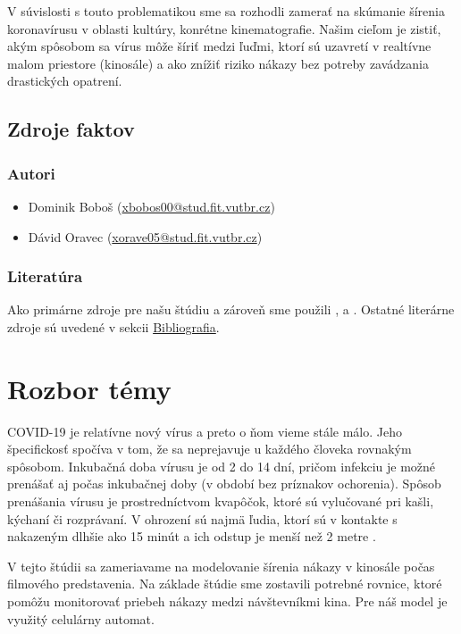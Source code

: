 \documentclass[a4paper, 11pt]{article}
\begin{document}
	\par V súvislosti s touto problematikou sme sa rozhodli zamerať na skúmanie šírenia koronavírusu v oblasti kultúry, konrétne kinematografie. Našim cieľom je zistiť, akým spôsobom sa vírus môže šíriť medzi ľuďmi, ktorí sú uzavretí v realtívne malom priestore (kinosále) a ako znížiť riziko nákazy bez potreby zavádzania drastických opatrení.
	
    	\subsection{Zdroje faktov}
    	    \subsubsection{Autori}
    	    \begin{itemize}
    	        \item Dominik Boboš (\href{mailto:xbobos00@stud.fit.vutbr.cz}{xbobos00@stud.fit.vutbr.cz})
    	        \item Dávid Oravec (\href{mailto:xorave05@stud.fit.vutbr.cz}{xorave05@stud.fit.vutbr.cz})
    	    \end{itemize}
    	    
    	    \subsubsection{Literatúra}
    	    Ako primárne zdroje pre našu štúdiu a zároveň  sme použili \cite{maxbrenner2020}, \cite{charlesconnor2020} a \cite{joslelieveldfrankhelleiset.al.2020}. Ostatné literárne zdroje sú uvedené v sekcii \hyperref[sec:bib]{Bibliografia}.
	    
	\section{Rozbor témy}
	\par COVID-19 je relatívne nový vírus a preto o ňom vieme stále málo. Jeho špecifickosť spočíva v tom, že sa neprejavuje u každého človeka rovnakým spôsobom. Inkubačná doba vírusu je od 2 do 14 dní, pričom infekciu je možné prenášať aj počas inkubačnej doby (v období bez príznakov ochorenia). Spôsob prenášania vírusu je prostredníctvom kvapôčok, ktoré sú vylučované pri kašli, kýchaní či rozprávaní. V ohrození sú najmä ľudia, ktorí sú v kontakte s nakazeným dlhšie ako 15 minút a ich odstup je menší než 2 metre \cite{wikipedia}. 
	
	\par V tejto štúdii sa zameriavame na modelovanie šírenia nákazy v kinosále počas filmového predstavenia. Na základe štúdie \cite{joslelieveldfrankhelleiset.al.2020} sme zostavili potrebné rovnice, ktoré pomôžu monitorovať priebeh nákazy medzi návštevníkmi kina. Pre náš model je využitý celulárny automat.
	
\end{document}
